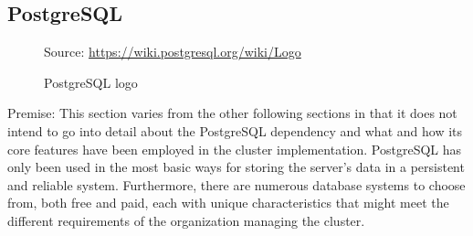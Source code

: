 \subsection{PostgreSQL}
\label{subsec:implementation_dependencies_postgresql}

\begin{figure} %
  \centering
  \def\stackalignment{l} %
  {\scriptsize \parbox[t]{\linewidth}{ Source: \url{https://wiki.postgresql.org/wiki/Logo}} }
  \caption{PostgreSQL logo}
\end{figure}

Premise: This section varies from the other following sections in that it does not
intend to go into detail about the PostgreSQL dependency and what and how its core
features have been employed in the cluster implementation. PostgreSQL has only
been used in the most basic ways for storing the server's data in a persistent
and reliable system. Furthermore, there are numerous database systems to choose
from, both free and paid, each with unique characteristics that might meet the
different requirements of the organization managing the cluster. \\ %

